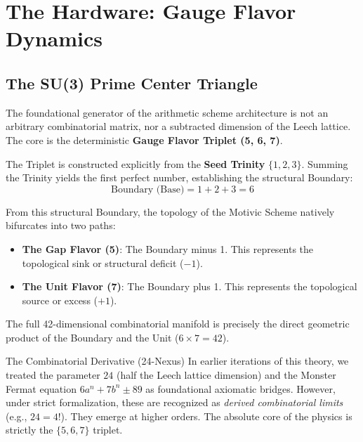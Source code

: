 \section{The Hardware: Gauge Flavor Dynamics}

\subsection{The SU(3) Prime Center Triangle}

The foundational generator of the arithmetic scheme architecture is not an arbitrary combinatorial matrix, nor a subtracted dimension of the Leech lattice. The core is the deterministic \textbf{Gauge Flavor Triplet (5, 6, 7)}. 

The Triplet is constructed explicitly from the \textbf{Seed Trinity} $\{1, 2, 3\}$. Summing the Trinity yields the first perfect number, establishing the structural Boundary:
\begin{equation}
    \text{Boundary (Base)} = 1 + 2 + 3 = 6
\end{equation}

From this structural Boundary, the topology of the Motivic Scheme natively bifurcates into two paths:
\begin{itemize}
    \item \textbf{The Gap Flavor (5)}: The Boundary minus 1. This represents the topological sink or structural deficit ($-1$).
    \item \textbf{The Unit Flavor (7)}: The Boundary plus 1. This represents the topological source or excess ($+1$).
\end{itemize}

The full 42-dimensional combinatorial manifold is precisely the direct geometric product of the Boundary and the Unit ($6 \times 7 = 42$).

\begin{theorembox}{The Combinatorial Derivative (24-Nexus)}
In earlier iterations of this theory, we treated the parameter $24$ (half the Leech lattice dimension) and the Monster Fermat equation $6a^n + 7b^n \pm 89$ as foundational axiomatic bridges. However, under strict formalization, these are recognized as \emph{derived combinatorial limits} (e.g., $24 = 4!$). They emerge at higher orders. The absolute core of the physics is strictly the $\{5, 6, 7\}$ triplet.
\end{theorembox}

